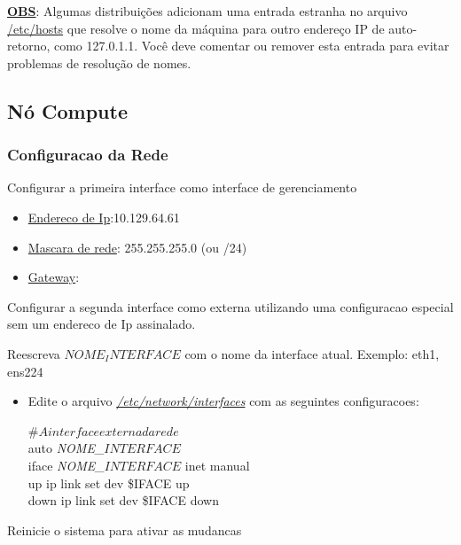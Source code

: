 \documentclass[a4paper]{book}
\begin{document}
			\underline{\textbf{OBS}}: Algumas distribuições adicionam uma entrada estranha no arquivo \underline{/etc/hosts} que resolve o nome da máquina para outro endereço IP de auto-retorno, como 127.0.1.1. Você deve comentar ou remover esta entrada para evitar problemas de resolução de nomes.
			
			\subsection{Nó Compute}
			\subsubsection{Configuracao da Rede}
				Configurar a primeira interface como interface de gerenciamento
				\begin{itemize}
					\item \underline{Endereco de Ip}:10.129.64.61
					\item \underline{Mascara de rede}: 255.255.255.0 (ou /24)
					\item \underline{Gateway}:
				\end{itemize}							
			
				Configurar a segunda interface como externa utilizando uma configuracao especial sem um endereco de Ip assinalado. 
				
				Reescreva \emph{$NOME_INTERFACE$} com o nome da interface atual. Exemplo: eth1, ens224
				

				\begin{itemize}
					\item Edite o arquivo \emph{\underline{/etc/network/interfaces}} com as seguintes configuracoes:
					
					\begin{snugshade}
						\#$A interface externa da rede$ \\
						auto \emph{NOME\_$INTERFACE$} \\
						iface \emph{NOME\_$INTERFACE$} inet manual \\
						\hspace*{2 cm}  up ip link set dev \$IFACE up \\
						\hspace*{2 cm}  down ip link set dev \$IFACE down \\					
					\end{snugshade}
				\end{itemize}
				Reinicie o sistema para ativar as mudancas
\end{document}
